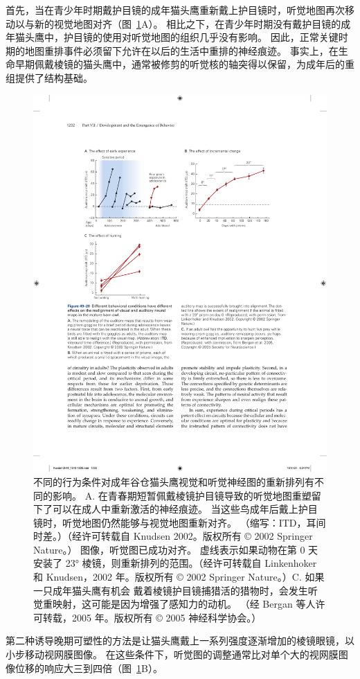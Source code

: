 首先，当在青少年时期戴护目镜的成年猫头鹰重新戴上护目镜时，听觉地图再次移动以与新的视觉地图对齐（图~\ref{fig:49_20}A）。
相比之下，在青少年时期没有戴护目镜的成年猫头鹰中，护目镜的使用对听觉地图的组织几乎没有影响。
因此，正常关键时期的地图重排事件必须留下允许在以后的生活中重排的神经痕迹。
事实上，在生命早期佩戴棱镜的猫头鹰中，通常被修剪的听觉核的轴突得以保留，为成年后的重组提供了结构基础。


\begin{figure}[htbp]
	\centering
	\includegraphics[width=0.8\linewidth]{chap49/fig_49_20}
	\caption{不同的行为条件对成年谷仓猫头鹰视觉和听觉神经图的重新排列有不同的影响。 A. 在青春期短暂佩戴棱镜护目镜导致的听觉地图重塑留下了可以在成人中重新激活的神经痕迹。 当这些鸟成年后戴上护目镜时，听觉地图仍然能够与视觉地图重新对齐。 （缩写：ITD，耳间时差。）（经许可转载自 Knudsen 2002。版权所有 © 2002 Springer Nature。） 图像，听觉图已成功对齐。 虚线表示如果动物在第 0 天安装了 23° 棱镜，则重新排列的范围。（经许可转载自 Linkenhoker 和 Knudsen，2002 年。版权所有 © 2002 Springer Nature。）C. 如果一只成年猫头鹰有机会 戴着棱镜护目镜捕猎活的猎物时，会发生听觉重映射，这可能是因为增强了感知力的动机。 （经 Bergan 等人许可转载，2005 年。版权所有 © 2005 神经科学协会。）}
	\label{fig:49_20}
\end{figure}


第二种诱导晚期可塑性的方法是让猫头鹰戴上一系列强度逐渐增加的棱镜眼镜，以小步移动视网膜图像。
在这些条件下，听觉图的调整通常比对单个大的视网膜图像位移的响应大三到四倍（图~\ref{fig:49_20}B）。


